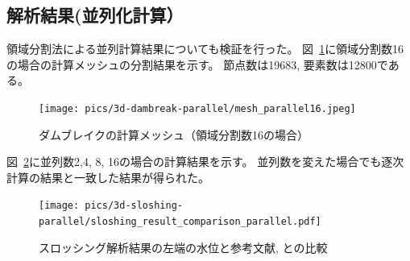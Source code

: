\newpage
\subsection{解析結果(並列化計算）}

領域分割法による並列計算結果についても検証を行った。
図~\ref{fig:3d-dambreak-mesh-parallel16}に領域分割数16の場合の計算メッシュの分割結果を示す。
節点数は19683, 要素数は12800である。

\begin{figure}[H]
    \centering
    \texttt{[image: pics/3d-dambreak-parallel/mesh\_parallel16.jpeg]}
	\caption{ダムブレイクの計算メッシュ（領域分割数16の場合）}
	\label{fig:3d-dambreak-mesh-parallel16}
\end{figure}

図~\ref{fig:3d-sloshing-result-parallel}に並列数2,4, 8, 16の場合の計算結果を示す。
並列数を変えた場合でも逐次計算の結果と一致した結果が得られた。

\begin{figure}[H]
    \centering
	\texttt{[image: pics/3d-sloshing-parallel/sloshing\_result\_comparison\_parallel.pdf]}
	\caption{スロッシング解析結果の左端の水位と参考文献\cite{Okamoto1992}, \cite{Sakuraba2001}との比較}
	\label{fig:3d-sloshing-result-parallel}
\end{figure}
